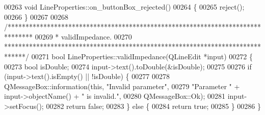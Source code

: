 \begin{DoxyCode}
00263 \textcolor{keywordtype}{void} LineProperties::on\_buttonBox\_rejected()
00264 \{
00265   reject();
00266 \}
00267 
00268 \textcolor{comment}{/*******************************************************************************}
00269 \textcolor{comment}{ * validImpedance.}
00270 \textcolor{comment}{ ******************************************************************************/}
00271 \textcolor{keywordtype}{bool} LineProperties::validImpedance(QLineEdit *input)
00272 \{
00273   \textcolor{keywordtype}{bool} isDouble;
00274   input->text().toDouble(&isDouble);
00275 
00276   \textcolor{keywordflow}{if} (input->text().isEmpty() || !isDouble) \{
00277 
00278     QMessageBox::information(\textcolor{keyword}{this}, \textcolor{stringliteral}{"Invalid parameter"},
00279                              \textcolor{stringliteral}{"Parameter "} + input->objectName() + \textcolor{stringliteral}{" is invalid."},
00280                              QMessageBox::Ok);
00281     input->setFocus();
00282     \textcolor{keywordflow}{return} \textcolor{keyword}{false};
00283   \} \textcolor{keywordflow}{else} \{
00284     \textcolor{keywordflow}{return} \textcolor{keyword}{true};
00285   \}
00286 \}
\end{DoxyCode}
